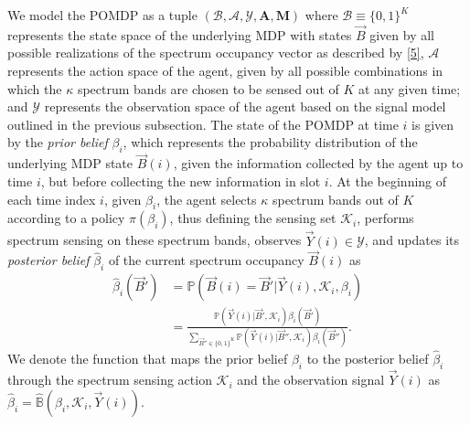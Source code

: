 \documentclass[10pt,twocolumn]{IEEEtran}
\begin{document}
We model the POMDP as a tuple $(\mathcal B,\mathcal{A},\mathcal{Y},\mathbf{A},\mathbf{M})$ where $\mathcal{B}\equiv\{0,1\}^K$ represents the state space of the underlying MDP with states $\vec{B}$ given by all possible realizations of the spectrum occupancy vector as described by \eqref{5}, $\mathcal{A}$ represents the action space of the agent, given by all possible combinations in which the $\kappa$ spectrum bands are chosen to be sensed out of $K$ at any given time; and $\mathcal{Y}$ represents the observation space of the agent based on the signal model outlined in the previous subsection. 
The state of the POMDP at time $i$ is given by the \emph{prior belief} $\beta_i$, which represents the probability distribution of the underlying MDP state $\vec{B}(i)$, given the information collected by the agent up to time $i$, but before collecting the new information in slot $i$. At the beginning of each time index $i$, given $\beta_i$, the agent selects $\kappa$ spectrum bands out of $K$ according to a policy $\pi(\beta_i)$, thus defining the sensing set $\mathcal K_i$, performs spectrum sensing  on these spectrum bands, observes $\vec{Y}(i){\in} \mathcal{Y}$, and updates its \emph{posterior belief} $\hat{\beta}_i$ of the current spectrum occupancy $\vec{B}(i)$ as 
\begin{align}\label{11}
\hat\beta_i(\vec{B}') &= \mathbb{P}(\vec{B}(i) = \vec{B}'|\vec{Y}(i), \mathcal K_i, \beta_i)\\&=
\nonumber
\frac{\mathbb{P}(\vec{Y}(i)|\vec{B}', \mathcal{K}_i) \beta_i(\vec{B}')}{
\sum_{\vec{B}'' {\in} \{0,1\}^K} \mathbb{P}(\vec{Y}(i)|\vec{B}'', \mathcal{K}_i) \beta_i(\vec{B}'')}.
\end{align}
We denote the function that maps the prior belief $\beta_i$ to the posterior belief $\hat\beta_i$ through the spectrum sensing action $\mathcal K_i$ and the observation signal $\vec{Y}(i)$ as $\hat\beta_i=\hat{\mathbb B}(\beta_i, \mathcal K_i, \vec{Y}(i))$.
\end{document}
